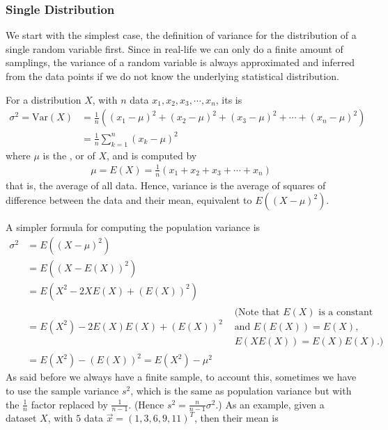 \subsubsection{Single Distribution}
We start with the simplest case, the definition of variance for the distribution of a single random variable first. Since in real-life we can only do a finite amount of samplings, the variance of a random variable is always approximated and inferred from the data points if we do not know the underlying statistical distribution.
\begin{defn}
\label{defn:variance}
For a distribution $X$, with $n$ data $x_1, x_2, x_3, \cdots, x_n$, its  is
\begin{align*}
\sigma^2 = \text{Var}(X) &= \frac{1}{n} ((x_1 - \mu)^2 + (x_2 - \mu)^2 + (x_3 - \mu)^2 + \cdots + (x_n - \mu)^2) \\
&= \frac{1}{n} \sum_{k=1}^n (x_k - \mu)^2
\end{align*}
where $\mu$ is the , or  of $X$, and is computed by
\begin{align*}
\mu = E(X) = \frac{1}{n} (x_1 + x_2 + x_3 + \cdots + x_n)
\end{align*}
that is, the average of all data. Hence, variance is the average of squares of difference between the data and their mean, equivalent to $E((X-\mu)^2)$.
\end{defn}
A simpler formula for computing the population variance is
\begin{align*}
\sigma^2 &= E((X-\mu)^2) \\
&= E((X-E(X))^2) \\
&= E(X^2-2XE(X)+(E(X))^2) \\
&= E(X^2) - 2E(X)E(X) + (E(X))^2 & \begin{aligned}\text{(Note that $E(X)$ is a constant}\\ \text{and $E(E(X)) = E(X)$,} \\
\text{$E(XE(X)) = E(X)E(X)$.)}\end{aligned} \\
&= E(X^2) - (E(X))^2 = E(X^2) - \mu^2
\end{align*}
As said before we always have a finite sample, to account this, sometimes we have to use the sample variance $s^2$, which is the same as population variance but with the $\frac{1}{n}$ factor replaced by $\frac{1}{n-1}$. (Hence $s^2 = \frac{n}{n-1}\sigma^2$.) As an example, given a dataset $X$, with $5$ data $\vec{x} = (1, 3, 6, 9, 11)^T$, then their mean is
